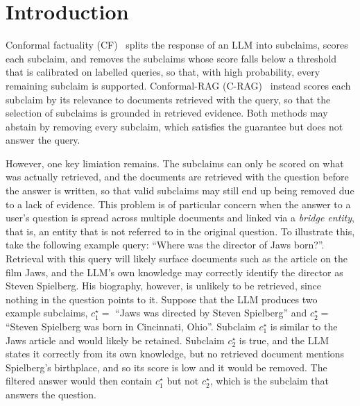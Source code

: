 \section{Introduction}\label{sec:intro}


Conformal factuality (CF)~\cite{mohri2024language} splits the response of an LLM into subclaims, scores each subclaim, and removes the subclaims whose score falls below a threshold that is calibrated on labelled queries, so that, with high probability, every remaining subclaim is supported. Conformal-RAG (C-RAG)~\cite{feng2025response} instead scores each subclaim by its relevance to documents retrieved with the query, so that the selection of subclaims is grounded in retrieved evidence. Both methods may abstain by removing every subclaim, which satisfies the guarantee but does not answer the query.

However, one key limiation remains. The subclaims can only be scored on what was actually retrieved, and the documents are retrieved with the question before the answer is written, so that valid subclaims may still end up being removed due to a lack of evidence. This problem is of particular concern when the answer to a user's question is spread across multiple documents and linked via a \emph{bridge entity}, that is, an entity that is not referred to in the original question. To illustrate this, take the following example query: ``Where was the director of Jaws born?''. Retrieval with this query will likely surface documents such as the article on the film Jaws, and the LLM's own knowledge may correctly identify the director as Steven Spielberg. His biography, however, is unlikely to be retrieved, since nothing in the question points to it. Suppose that the LLM produces two example subclaims, $c^{\star}_1 =$ ``Jaws was directed by Steven Spielberg'' and $c^{\star}_2 =$ ``Steven Spielberg was born in Cincinnati, Ohio''. Subclaim $c^{\star}_1$ is similar to the Jaws article and would likely be retained. Subclaim $c^{\star}_2$ is true, and the LLM states it correctly from its own knowledge, but no retrieved document mentions Spielberg's birthplace, and so its score is low and it would be removed. The filtered answer would then contain $c^{\star}_1$ but not $c^{\star}_2$, which is the subclaim that answers the question.
 
